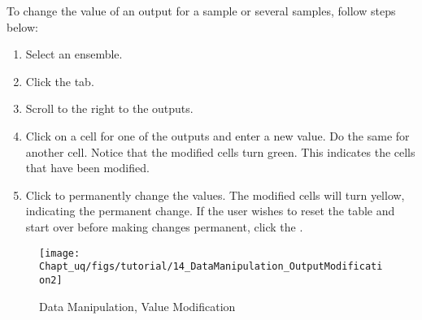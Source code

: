 To change the value of an output for a sample or several samples, follow steps below:
\begin{enumerate}
\item{Select an ensemble.}
\item{Click the  tab.}
\item{Scroll to the right to the outputs.}
\item{Click on a cell for one of the outputs and enter a new value. Do the
  same for another cell. Notice that the modified cells turn green. This
  indicates the cells that have been modified.}
\item{Click  to permanently change
  the values. The modified cells will turn yellow, indicating the permanent
  change. If the user wishes to reset the table and start over before
  making changes permanent, click the .}
\end{enumerate}

\begin{figure}[!htbp]
\centering \texttt{[image: Chapt\_uq/figs/tutorial/14\_DataManipulation\_OutputModification2]}
\caption{Data Manipulation, Value Modification}
\label{fig:uqt_data_mod_output}
\end{figure}

\pagebreak
